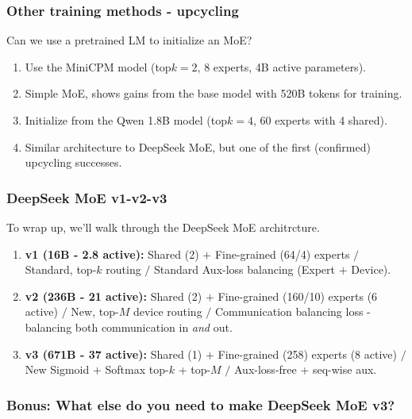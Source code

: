 \documentclass[12pt,twoside]{article}
\begin{document}
\subsubsection*{Other training methods - upcycling}

\begin{question}
    Can we use a pretrained LM to initialize an MoE?
\end{question}

\begin{enumerate}[label=(\alph*)]
    \item Use the MiniCPM model (top\(k = 2\), 8 experts, 4B active parameters).
    \item Simple MoE, shows gains from the base model with 520B tokens for training.
    \item Initialize from the Qwen 1.8B model (top\(k = 4\), 60 experts with 4 shared).
    \item Similar architecture to DeepSeek MoE, but one of the first (confirmed) upcycling successes. 
\end{enumerate}

\subsubsection*{DeepSeek MoE v1-v2-v3}

To wrap up, we'll walk through the DeepSeek MoE architrcture.

\begin{enumerate}[label=(\Roman*)]
    \item \textbf{v1 (16B - 2.8 active):} Shared (2) \(+\) Fine-grained (64/4) experts \(/\) Standard, top-\(k\) routing \(/\) Standard Aux-loss balancing (Expert \(+\) Device).
    \item \textbf{v2 (236B - 21 active):} Shared (2) \(+\) Fine-grained (160/10) experts (6 active) \(/\) New, top-\(M\) device routing \(/\) Communication balancing loss - balancing both communication in \textit{and} out. 
    \item \textbf{v3 (671B - 37 active):} Shared (1) \(+\) Fine-grained (258) experts (8 active) \(/\) New Sigmoid \(+\) Softmax top-\(k\) + top-\(M\) \(/\) Aux-loss-free + seq-wise aux.
\end{enumerate}

\subsubsection*{Bonus: What else do you need to make DeepSeek MoE v3?}
\end{document}

